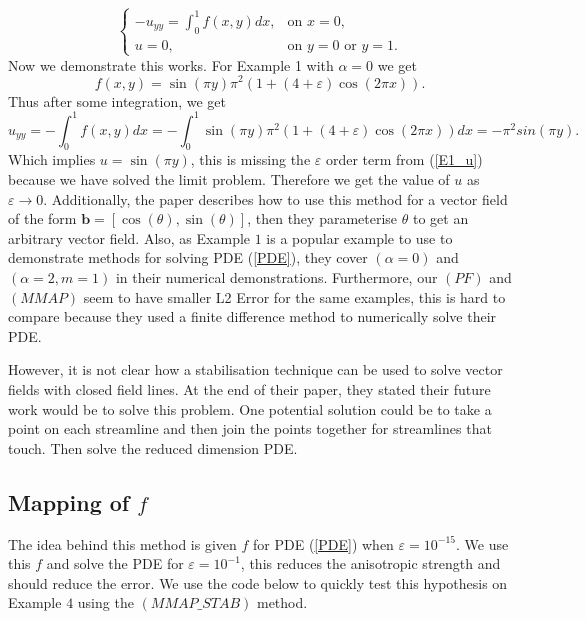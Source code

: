 \documentclass[12pt]{ociamthesis}
\begin{document}
\begin{equation}
\begin{cases}
-u_{yy} =\int_0^1 f(x, y) dx, &\text{on } x=0,\\
u = 0, &\text{on } y=0 \text{ or } y=1.
\end{cases}
\end{equation}
Now we demonstrate this works. For Example 1 with $\alpha = 0$ we get 
\begin{equation}
f(x,y) = \sin(\pi y)\pi^2(1+(4+\varepsilon)\cos(2\pi x)) .
\end{equation}
Thus after some integration, we get
\begin{equation}
u_{yy} = - \int_0^1 f(x,y)dx = - \int_0^1 \sin(\pi y)\pi^2(1+(4+\varepsilon)\cos(2\pi x)) dx = -\pi^2 sin(\pi y).
\end{equation}
Which implies $u= \sin(\pi y)$, this is missing the $\varepsilon$ order term from (\ref{E1_u}) because we have solved the limit problem. Therefore we get the value of $u$ as $\varepsilon \rightarrow 0$. Additionally, the paper \cite{LINE_INT} describes how to use this method for a vector field of the form $\mathbf{b} = [\cos(\theta), \sin(\theta)]$, then they parameterise $\theta$ to get an arbitrary vector field. Also, as Example $1$ is a popular example to use to demonstrate methods for solving PDE (\ref{PDE}), they cover $(\alpha = 0)$ and $(\alpha=2, m=1)$ in their numerical demonstrations. Furthermore, our $(PF)$ and $(MMAP)$ seem to have smaller L2 Error for the same examples, this is hard to compare because they used a finite difference method to numerically solve their PDE.
 
 However, it is not clear how a stabilisation technique can be used to solve vector fields with closed field lines. At the end of their paper, they stated their future work would be to solve this problem. One potential solution could be to take a point on each streamline and then join the points together for streamlines that touch. Then solve the reduced dimension PDE.

\subsection{Mapping of $f$} \label{MAP_f}
The idea behind this method is given $f$ for PDE (\ref{PDE}) when $\varepsilon = 10^{-15}$. We use this $f$ and solve the PDE for $\varepsilon = 10^{-1}$, this reduces the anisotropic strength and should reduce the error. We use the code below to quickly test this hypothesis on Example $4$ using the $(MMAP\_STAB)$ method.
\end{document}
